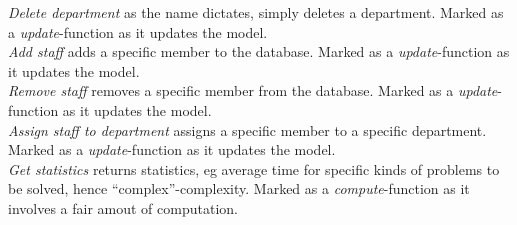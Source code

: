 \emph{Delete department} as the name dictates, simply deletes a department. Marked as a \textit{update}-function as it updates the model. \\
\emph{Add staff} adds a specific \astaff[] member to the database. Marked as a \textit{update}-function as it updates the model. \\
\emph{Remove staff} removes a specific \astaff[] member from the database. Marked as a \textit{update}-function as it updates the model. \\
\emph{Assign staff to department} assigns a specific \astaff[] member to a specific department. Marked as a \textit{update}-function as it updates the model. \\
\emph{Get statistics} returns statistics, eg average time for specific kinds of problems to be solved, hence ``complex''-complexity. Marked as a \textit{compute}-function as it involves a fair amout of computation.